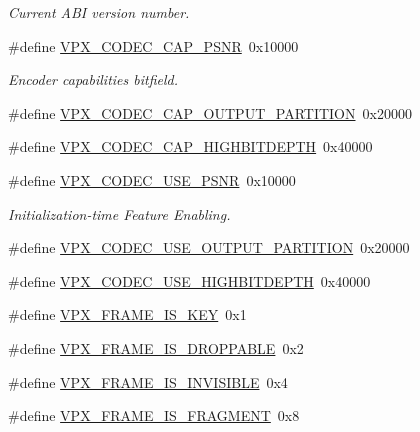\begin{DoxyCompactItemize}
\begin{DoxyCompactList}\small\item\em Current A\+BI version number. \end{DoxyCompactList}\item 
\#define \hyperlink{group__encoder_ga398803f408d6f71aae730b5ee7793e1c}{V\+P\+X\+\_\+\+C\+O\+D\+E\+C\+\_\+\+C\+A\+P\+\_\+\+P\+S\+NR}~0x10000
\begin{DoxyCompactList}\small\item\em Encoder capabilities bitfield. \end{DoxyCompactList}\item 
\#define \hyperlink{group__encoder_ga69768adb51faa28d98870cbc77e9ea93}{V\+P\+X\+\_\+\+C\+O\+D\+E\+C\+\_\+\+C\+A\+P\+\_\+\+O\+U\+T\+P\+U\+T\+\_\+\+P\+A\+R\+T\+I\+T\+I\+ON}~0x20000
\item 
\#define \hyperlink{group__encoder_ga8edce93a29457f2de6c0f92e3b3c192d}{V\+P\+X\+\_\+\+C\+O\+D\+E\+C\+\_\+\+C\+A\+P\+\_\+\+H\+I\+G\+H\+B\+I\+T\+D\+E\+P\+TH}~0x40000
\item 
\#define \hyperlink{group__encoder_ga57bb9eb1881c7e4bf86580660a5e40a0}{V\+P\+X\+\_\+\+C\+O\+D\+E\+C\+\_\+\+U\+S\+E\+\_\+\+P\+S\+NR}~0x10000
\begin{DoxyCompactList}\small\item\em Initialization-\/time Feature Enabling. \end{DoxyCompactList}\item 
\#define \hyperlink{group__encoder_gac26cd92b3719953aa0fbb0ff8c1d9c8d}{V\+P\+X\+\_\+\+C\+O\+D\+E\+C\+\_\+\+U\+S\+E\+\_\+\+O\+U\+T\+P\+U\+T\+\_\+\+P\+A\+R\+T\+I\+T\+I\+ON}~0x20000
\item 
\#define \hyperlink{group__encoder_ga69576ef94099286853e64aee29661608}{V\+P\+X\+\_\+\+C\+O\+D\+E\+C\+\_\+\+U\+S\+E\+\_\+\+H\+I\+G\+H\+B\+I\+T\+D\+E\+P\+TH}~0x40000
\item 
\#define \hyperlink{group__encoder_ga7a896eb3bc74f33419e6a9812c60e4c9}{V\+P\+X\+\_\+\+F\+R\+A\+M\+E\+\_\+\+I\+S\+\_\+\+K\+EY}~0x1
\item 
\#define \hyperlink{group__encoder_gab899503032065a30ac6864b4c89626a9}{V\+P\+X\+\_\+\+F\+R\+A\+M\+E\+\_\+\+I\+S\+\_\+\+D\+R\+O\+P\+P\+A\+B\+LE}~0x2
\item 
\#define \hyperlink{group__encoder_ga060d7e881d249bdb6e1a29b42e559685}{V\+P\+X\+\_\+\+F\+R\+A\+M\+E\+\_\+\+I\+S\+\_\+\+I\+N\+V\+I\+S\+I\+B\+LE}~0x4
\item 
\#define \hyperlink{group__encoder_gafb9f7dbf9b8a764c521d8b12c0e6959d}{V\+P\+X\+\_\+\+F\+R\+A\+M\+E\+\_\+\+I\+S\+\_\+\+F\+R\+A\+G\+M\+E\+NT}~0x8

\end{DoxyCompactItemize}
